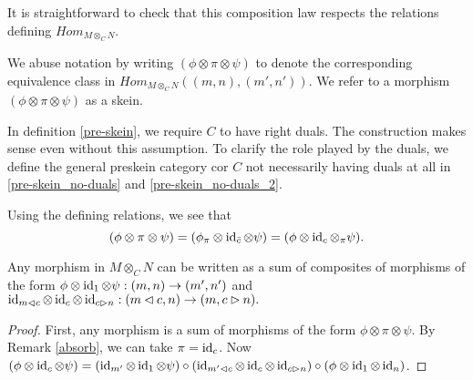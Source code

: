 \begin{definition}
    \begin{center}
    
  \end{center}

  \noindent It is straightforward to check that this composition law respects the
  relations defining $Hom_{M\otimes_C N}$.
\end{definition}

\begin{remark}
 
  \noindent We abuse notation by writing $(\phi\otimes\pi\otimes\psi)$ to
  denote the corresponding equivalence class in $Hom_{M\otimes_C
    N}((m,n),(m',n'))$. We refer to a morphism $(\phi\otimes\pi\otimes\psi)$
  as a skein.
\end{remark}

\begin{remark}

  \noindent In definition \ref{pre-skein}, we require $C$ to have right duals.
  The construction makes sense even without this assumption. To clarify the
  role played by the duals, we define the general preskein category cor $C$
  not necessarily having duals at all in \ref{pre-skein_no-duals} and
  \ref{pre-skein_no-duals_2}.
\end{remark}

\begin{remark}\label{absorb}
  
  Using the defining relations, we see
  that
  \[
    (\phi\otimes\pi\otimes\psi) =
    (\phi_{\pi}\otimes\operatorname{id}_{\bar{c}}\otimes\psi) =
    (\phi\otimes\operatorname{id}_c\otimes{_{\pi}\psi}).
  \]
\end{remark}

\begin{lemma}\label{decompose}
  Any morphism in $M\otimes_C N$ can be written as a sum of composites of
  morphisms of the form $\phi\otimes\operatorname{id}_{1}\otimes\psi:(m,n)\to(m',n')$ and
  $\operatorname{id}_{m\lhd c}\otimes\operatorname{id}_c\otimes\operatorname{id}_{c\rhd n}:(m\lhd c,n)\to(m,c\rhd n).$
\end{lemma}

\begin{proof}
  First, any morphism is a sum of morphisms of the form
  $\phi\otimes\pi\otimes\psi$. By Remark \ref{absorb}, we can take
  $\pi=\operatorname{id}_c$. Now
  $(\phi\otimes\operatorname{id}_c\otimes\psi)
  =
  (\operatorname{id}_{m'}\otimes\operatorname{id}_1\otimes\psi)
  \circ
  (\operatorname{id}_{m'\lhd c}\otimes\operatorname{id}_c\otimes\operatorname{id}_{c\rhd n})
  \circ
  (\phi\otimes\operatorname{id}_1\otimes\operatorname{id}_n)$.
\end{proof}


